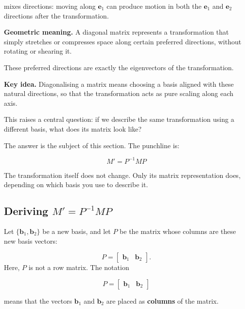 \documentclass[11pt,openany]{book}
\theoremstyle{definition}
\begin{document}
mixes directions: moving along $\mathbf{e}_1$ can produce motion in both the 
$\mathbf{e}_1$ and $\mathbf{e}_2$ directions after the transformation.

\medskip

\textbf{Geometric meaning.} A diagonal matrix represents a transformation that 
simply stretches or compresses space along certain preferred directions, without 
rotating or shearing it.

\medskip

These preferred directions are exactly the eigenvectors of the transformation.

\medskip

\textbf{Key idea.} Diagonalising a matrix means choosing a basis aligned with these 
natural directions, so that the transformation acts as pure scaling along each axis.

This raises a central question: if we describe the same transformation using a different 
basis, what does its matrix look like?

\medskip

The answer is the subject of this section. The punchline is:

\[
\boxed{M' = P^{-1} M P}
\]

The transformation itself does not change. Only its matrix representation does, 
depending on which basis you use to describe it.

\subsection{Deriving \texorpdfstring{$M' = P^{-1}MP$}{M prime equals P inverse M P}}

Let $\{\mathbf{b}_1, \mathbf{b}_2\}$ be a new basis, and let $P$ be the matrix whose 
columns are these new basis vectors:

\[
P = \begin{bmatrix} \mathbf{b}_1 & \mathbf{b}_2 \end{bmatrix}.
\]
Here, $P$ is not a row matrix. The notation

\[
P = \begin{bmatrix} \mathbf{b}_1 & \mathbf{b}_2 \end{bmatrix}
\]

means that the vectors $\mathbf{b}_1$ and $\mathbf{b}_2$ are placed as \textbf{columns} of the matrix.
\end{document}
